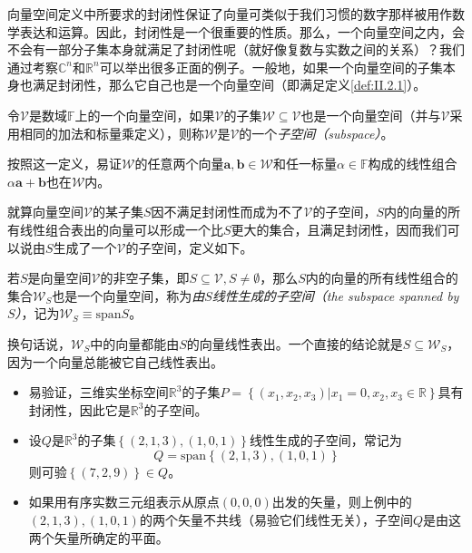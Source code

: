 \documentclass[../main.tex]{subfiles}
\begin{document}
向量空间定义中所要求的封闭性保证了向量可类似于我们习惯的数字那样被用作数学表达和运算。因此，封闭性是一个很重要的性质。那么，一个向量空间之内，会不会有一部分子集本身就满足了封闭性呢（就好像复数与实数之间的关系）？我们通过考察$\mathbb{C}^n$和$\mathbb{R}^n$可以举出很多正面的例子。一般地，如果一个向量空间的子集本身也满足封闭性，那么它自己也是一个向量空间（即满足定义\ref{def:II.2.1}）。

\begin{definition}[子空间]\label{def:II.2.3}\cite[\S 7.1定义1.2及其后例题]{周胜林2012线性代数}
    令$\mathcal{V}$是数域$\mathbb{F}$上的一个向量空间，如果$\mathcal{V}$的子集$\mathcal{W}\subseteq\mathcal{V}$也是一个向量空间（并与$\mathcal{V}$采用相同的加法和标量乘定义），则称$\mathcal{W}$是$\mathcal{V}$的一个\emph{子空间（subspace）}。
\end{definition}

按照这一定义，易证$\mathcal{W}$的任意两个向量$\mathbf{a},\mathbf{b}\in\mathcal{W}$和任一标量$\alpha\in\mathbb{F}$构成的线性组合$\alpha\mathbf{a}+\mathbf{b}$也在$\mathcal{W}$内\cite[\S 7.1定理1.1]{周胜林2012线性代数}。

就算向量空间$\mathcal{V}$的某子集$S$因不满足封闭性而成为不了$\mathcal{V}$的子空间，$S$内的向量的所有线性组合表出的向量可以形成一个比$S$更大的集合，且满足封闭性，因而我们可以说由$S$生成了一个$\mathcal{V}$的子空间，定义如下。

\begin{definition}[线性生成空间]\label{def:II.2.4}
    若$S$是向量空间$\mathcal{V}$的非空子集，即$S\subseteq\mathcal{V},S\neq\emptyset$，那么$S$内的向量的所有线性组合的集合$\mathcal{W}_S$也是一个向量空间，称为\emph{由$S$线性生成的子空间（the subspace spanned by $S$）}，记为$\mathcal{W}_S\equiv\mathrm{span}S$。
\end{definition}

换句话说，$\mathcal{W}_S$中的向量都能由$S$的向量线性表出。一个直接的结论就是$S\subseteq\mathcal{W}_S$，因为一个向量总能被它自己线性表出。

\begin{example}\label{exp:II.2.2}
    \quad
    \begin{itemize}
        \item 易验证，三维实坐标空间$\mathbb{R}^3$的子集$P=\left\{\left(x_1,x_2,x_3\right)|x_1=0,x_2,x_3\in\mathbb{R}\right\}$具有封闭性，因此它是$\mathbb{R}^3$的子空间。
        \item 设$Q$是$\mathbb{R}^3$的子集$\left\{\left(2,1,3\right),\left(1,0,1\right)\right\}$线性生成的子空间，常记为\[Q=\mathrm{span}\left\{\left(2,1,3\right),\left(1,0,1\right)\right\}\]则可验$\left\{\left(7,2,9\right)\right\}\in Q$。
        \item 如果用有序实数三元组表示从原点$\left(0,0,0\right)$出发的矢量，则上例中的$\left(2,1,3\right),\left(1,0,1\right)$的两个矢量不共线（易验它们线性无关），子空间$Q$是由这两个矢量所确定的平面。
    \end{itemize}
\end{example}
\end{document}
